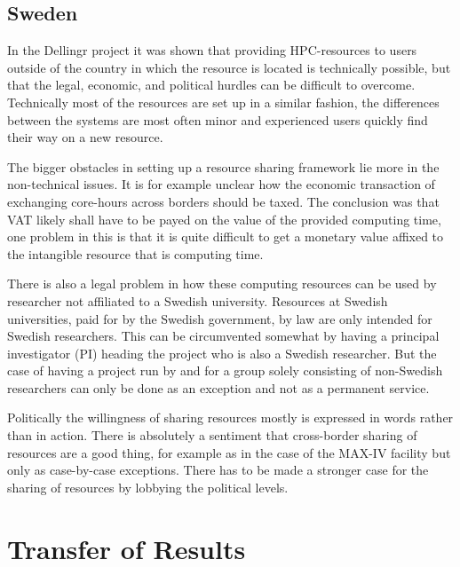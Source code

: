 \documentclass{article}
\newcommand{\dell}{Dellingr\xspace}
\begin{document}
\subsection{Sweden}

In the \dell project it was shown that providing HPC-resources to users outside of the country in which the resource is located is technically possible, but that the legal, economic, and political hurdles can be difficult to overcome. 
Technically most of the resources are set up in a similar fashion, the differences between the systems are most often minor and experienced users quickly find their way on a new resource. 

The bigger obstacles in setting up a resource sharing framework lie more in the non-technical issues. 
It is for example unclear how the economic transaction of exchanging core-hours across borders should be taxed. 
The conclusion was that VAT likely shall have to be payed on the value of the provided computing time, one problem in this is that it is quite difficult to get a monetary value affixed to the intangible resource that is computing time. 

There is also a legal problem in how these computing resources can be used by researcher not affiliated to a Swedish university. 
Resources at Swedish universities, paid for by the Swedish government, by law are only intended for Swedish researchers. 
This can be circumvented somewhat by having a principal investigator (PI) heading the project who is also a Swedish researcher. 
But the case of having a project run by and for a group solely consisting of non-Swedish researchers can only be done as an exception and not as a permanent service. 

Politically the willingness of sharing resources mostly is expressed in words rather than in action. 
There is absolutely a sentiment that cross-border sharing of resources are a good thing, for example as in the case of the MAX-IV facility but only as case-by-case exceptions. 
There has to be made a stronger case for the sharing of resources by lobbying the political levels.

\section{Transfer of Results}
\label{sec:transfer}
\end{document}
